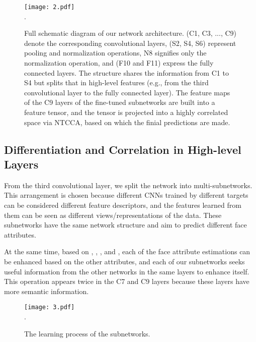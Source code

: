 \documentclass{sig-alternate-05-2015}
\begin{document}
\begin{figure*}[t]
\setlength{\fboxsep}{0pt}
\setlength{\fboxrule}{0pt}
\begin{center}
\texttt{[image: 2.pdf]} \\
\DeclareGraphicsExtensions.
\end{center}
\caption{Full schematic diagram of our network architecture. (C1, C3, ..., C9) denote the corresponding convolutional layers, (S2, S4, S6) represent pooling and normalization operations, N8 signifies only the normalization operation, and (F10 and F11) express the fully connected layers. The structure shares the information from C1 to S4 but splits that in high-level features (e.g., from the third convolutional layer to the fully connected layer). The feature maps of the C9 layers of the fine-tuned subnetworks are built into a feature tensor, and the tensor is projected into a highly correlated space via NTCCA, based on which the finial predictions are made.}
\label{fig:2}
\end{figure*}



\subsection{Differentiation and Correlation in High-level Layers }
From the third convolutional layer, we split the network into multi-subnetworks. This arrangement is chosen because different CNNs trained by different targets can be considered different feature descriptors, and the features learned from them can be seen as different views/representations of the data. These subnetworks have the same network structure and aim to predict different face attributes.

At the same time, based on \cite{7755833}, \cite{7060650}, \cite{5543609}, and \cite{8082561}, each of the face attribute estimations can be enhanced based on the other attributes, and each of our subnetworks seeks useful information from the other networks in the same layers to enhance itself. This operation appears twice in the C7 and C9 layers because these layers have more semantic information.

\begin{figure}[!hbpt]
\centering
\setlength{\fboxsep}{0pt}
\setlength{\fboxrule}{0pt}
\texttt{[image: 3.pdf]} \\
\DeclareGraphicsExtensions.
\caption{The learning process of the subnetworks. }
\label{fig:3}
\end{figure}
\end{document}
